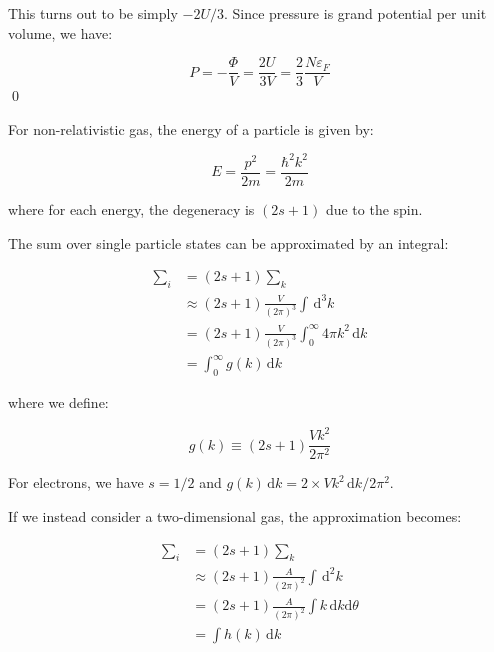 \documentclass[12pt]{article}
\begin{document}
This turns out to be simply $-2U/3$. Since pressure is grand potential per unit volume, we have:

\begin{equation}
    P = -\frac{\Phi}{V} = \frac{2U}{3V} = \frac{2}{3} \frac{N \varepsilon_{F}}{V}
\end{equation}
\qed



For non-relativistic gas, the energy of a particle is given by:

\begin{equation}
    E = \frac{p^{2}}{2m} = \frac{\hbar^{2} k^{2}}{2m}
\end{equation}

where for each energy, the degeneracy is $(2s + 1)$ due to the spin.

The sum over single particle states can be approximated by an integral:

\begin{equation}
    \begin{split}
        \sum_{i} &= (2s + 1) \sum_{k} \\
        &\approx (2s + 1) \frac{V}{(2\pi)^{3}} \int \, \mathrm{d}^{3}k \\
        &= (2s + 1) \frac{V}{(2\pi)^{3}} \int_{0}^{\infty} 4\pi k^{2} \, \mathrm{d}k \\
        &= \int_{0}^{\infty} g(k) \, \mathrm{d}k
    \end{split}
\end{equation}

where we define:

\begin{equation}
    g(k) \equiv (2s + 1) \frac{Vk^{2}}{2\pi^{2}}
\end{equation}

For electrons, we have $s = 1/2$ and $g(k) \, \mathrm{d}k = 2 \times Vk^{2} \, \mathrm{d}k / 2\pi^{2}$.

If we instead consider a two-dimensional gas, the approximation becomes:

\begin{equation}
    \begin{split}
        \sum_{i} &= (2s + 1) \sum_{k} \\
        &\approx (2s + 1) \frac{A}{(2\pi)^{2}} \int \, \mathrm{d}^{2}k \\
        &= (2s + 1) \frac{A}{(2\pi)^{2}} \int k \, \mathrm{d}k \mathrm{d}\theta \\
        &= \int h(k) \, \mathrm{d}k
    \end{split}
\end{equation}
\end{document}
